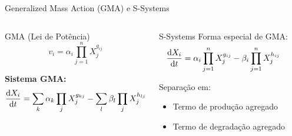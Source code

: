 \begin{frame}{Generalized Mass Action (GMA) e S-Systems}
\begin{columns}
\begin{block}{GMA (Lei de Potência)}
\begin{equation*}
v_i = \alpha_i \prod_{j=1}^{n} X_j^{g_{ij}}
\end{equation*}

\textbf{Sistema GMA:}
\begin{equation*}
\frac{\mathrm{d} X_i}{\mathrm{d} t} = \sum_k \alpha_k \prod_j X_j^{g_{kj}} - \sum_l \beta_l \prod_j X_j^{h_{lj}}
\end{equation*}
\end{block}

\begin{block}{S-Systems}
Forma especial de GMA:
\begin{equation*}
\frac{\mathrm{d} X_i}{\mathrm{d} t} = \alpha_i \prod_{j=1}^{n} X_j^{g_{ij}} - \beta_i \prod_{j=1}^{n} X_j^{h_{ij}}
\end{equation*}

Separação em:
\begin{itemize}
    \item Termo de produção agregado
    \item Termo de degradação agregado
\end{itemize}
\end{block}
\end{columns}

\vspace{0.3cm}

\end{frame}

